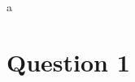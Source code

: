 \documentclass[a4paper,10pt]{article}
\title{}
\author{Andrew Rosen}
\date{\today}
\begin{document}
a 
\section{Question 1}
\end{document}
